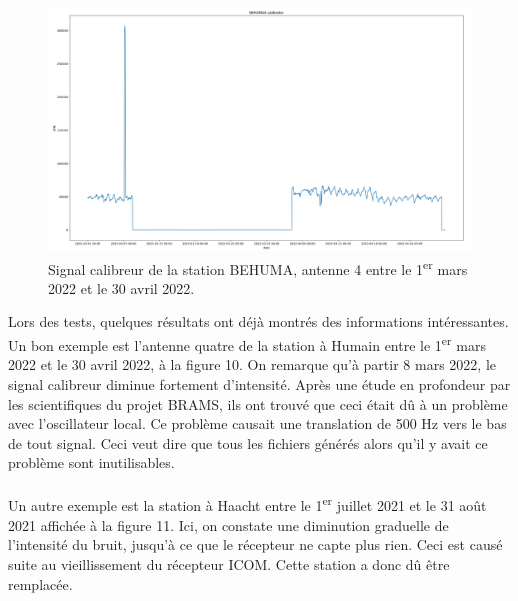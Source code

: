 \documentclass[11pt]{article}
\begin{document}
\begin{figure}[t]
    \begin{center}
        \includegraphics[scale=0.235]{BEHUMA4_2022-03-01_2022-04-30_calibrator.png}
        \caption{Signal calibreur de la station BEHUMA, antenne 4 entre le 1\textsuperscript{er} mars 2022 et le 30 avril 2022.}
    \end{center}
\end{figure}

Lors des tests, quelques résultats ont déjà montrés des informations intéressantes.
Un bon exemple est l'antenne quatre de la station à Humain entre le 1\textsuperscript{er} mars 2022 et le 30 avril 2022, à la figure 10.
On remarque qu'à partir 8 mars 2022, le signal calibreur diminue fortement d'intensité.
Après une étude en profondeur par les scientifiques du projet BRAMS, ils ont trouvé que ceci était dû à un problème avec l'oscillateur local.
Ce problème causait une translation de 500 Hz vers le bas de tout signal.
Ceci veut dire que tous les fichiers générés alors qu'il y avait ce problème sont inutilisables.\\
\\
Un autre exemple est la station à Haacht entre le 1\textsuperscript{er} juillet 2021 et le 31 août 2021 affichée à la figure 11.
Ici, on constate une diminution graduelle de l'intensité du bruit, jusqu'à ce que le récepteur ne capte plus rien.
Ceci est causé suite au vieillissement du récepteur ICOM.
Cette station a donc dû être remplacée.
\end{document}
